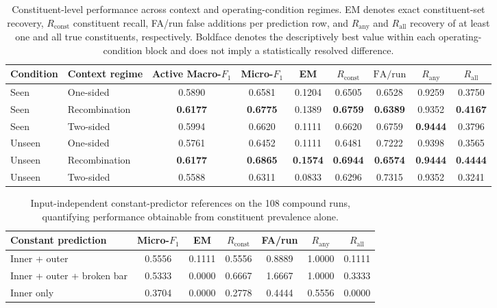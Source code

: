 \documentclass{ieeeaccess}
\begin{document}
\begin{table}[t]
\caption{Constituent-level performance across context and operating-condition
regimes. EM denotes exact constituent-set recovery, $R_{\mathrm{const}}$
constituent recall, FA/run false additions per prediction row, and
$R_{\mathrm{any}}$ and $R_{\mathrm{all}}$ recovery of at least one and all true constituents, respectively. Boldface denotes the descriptively best value within each operating-condition block and does not imply a statistically resolved difference.}
\label{tab:crossed_results}
\centering
\footnotesize
\begin{tabular}{llccccccc}
\toprule
Condition &
Context regime &
Active Macro-$F_1$ &
Micro-$F_1$ &
EM &
$R_{\mathrm{const}}$ &
$\mathrm{FA/run}$ &
$R_{\mathrm{any}}$ &
$R_{\mathrm{all}}$ \\
\midrule

Seen
& One-sided
& 0.5890
& 0.6581
& 0.1204
& 0.6505
& 0.6528
& 0.9259
& 0.3750 \\

Seen
& Recombination
& \textbf{0.6177}
& \textbf{0.6775}
& 0.1389
& \textbf{0.6759}
& \textbf{0.6389}
& 0.9352
& \textbf{0.4167} \\

Seen
& Two-sided
& 0.5994
& 0.6620
& 0.1111
& 0.6620
& 0.6759
& \textbf{0.9444}
& 0.3796 \\

\midrule

Unseen
& One-sided
& 0.5761
& 0.6452
& 0.1111
& 0.6481
& 0.7222
& 0.9398
& 0.3565 \\

Unseen
& Recombination
& \textbf{0.6177}
& \textbf{0.6865}
& \textbf{0.1574}
& \textbf{0.6944}
& \textbf{0.6574}
& \textbf{0.9444}
& \textbf{0.4444} \\

Unseen
& Two-sided
& 0.5588
& 0.6311
& 0.0833
& 0.6296
& 0.7315
& 0.9352
& 0.3241 \\

\bottomrule
\end{tabular}
\end{table}

\begin{table}[t]
\caption{Input-independent constant-predictor references on the 108 compound
runs, quantifying performance obtainable from constituent prevalence alone.}
\label{tab:trivial_baselines}
\centering
\footnotesize
\begin{tabular}{lcccccc}
\toprule
Constant prediction &
Micro-$F_1$ &
EM &
$R_{\mathrm{const}}$ &
FA/run &
$R_{\mathrm{any}}$ &
$R_{\mathrm{all}}$ \\
\midrule
Inner + outer
& 0.5556 & 0.1111 & 0.5556 & 0.8889 & 1.0000 & 0.1111 \\

Inner + outer + broken bar
& 0.5333 & 0.0000 & 0.6667 & 1.6667 & 1.0000 & 0.3333 \\

Inner only
& 0.3704 & 0.0000 & 0.2778 & 0.4444 & 0.5556 & 0.0000 \\
\bottomrule
\end{tabular}
\end{table}
\end{document}
